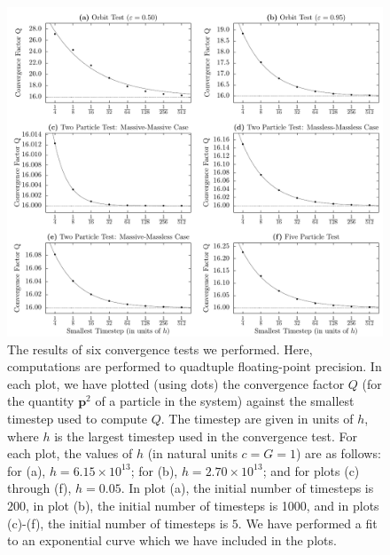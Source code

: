 \documentclass[aps,onecolumn,notitlepage,eqsecnum,nofootinbib,floatfix,superscriptaddress]{revtex4-1}
\begin{document}
\begin{figure}
 \includegraphics[width=\linewidth]{convergence_tests.pdf}
\caption{The results of six convergence tests we performed. Here, computations are performed to quadtuple floating-point precision. In each plot, we have plotted (using dots) the convergence factor $Q$ (for the quantity $\textbf{p}^2$ of a particle in the system) against the smallest timestep used to compute $Q$. The timestep are given in units of $h$, where $h$ is the largest timestep used in the convergence test. For each plot, the values of $h$ (in natural units $c=G=1$) are as follows: for (a), $h=6.15 \times 10^{13}$; for (b), $h=2.70 \times 10^{13}$; and for plots (c) through (f), $h=0.05$. In plot (a), the initial number of timesteps is $200$, in plot (b), the initial number of timesteps is 1000, and in plots (c)-(f), the initial number of timesteps is $5$. We have performed a fit to an exponential curve which we have included in the plots.}
\label{FIG-ConvergenceTests}
\end{figure}
\end{document}

